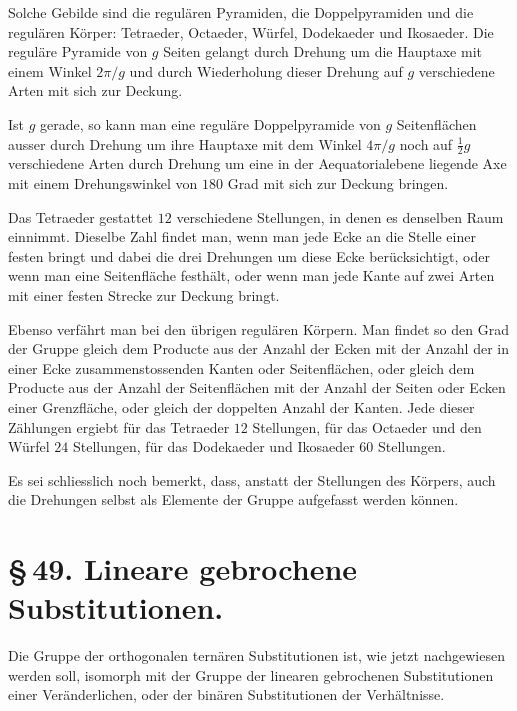 \documentclass[11pt]{article}
\begin{document}
Solche Gebilde sind die regulären Pyramiden, die Doppelpyramiden und die regulären Körper: Tetraeder, Octaeder, Würfel, Dodekaeder und Ikosaeder. Die reguläre Pyramide von $g$ Seiten gelangt durch Drehung um die Hauptaxe mit einem Winkel $2\pi/g$ und durch Wiederholung dieser Drehung auf $g$ verschiedene Arten mit sich zur Deckung.

Ist $g$ gerade, so kann man eine reguläre Doppelpyramide von $g$ Seitenflächen ausser durch Drehung um ihre Hauptaxe mit dem Winkel $4\pi/g$ noch auf $\frac12g$ verschiedene Arten durch Drehung um eine in der Aequatorialebene liegende Axe mit einem Drehungswinkel von $180$ Grad mit sich zur Deckung bringen.

Das Tetraeder gestattet $12$ verschiedene Stellungen, in denen es denselben Raum einnimmt. Dieselbe Zahl findet man, wenn man jede Ecke an die Stelle einer festen bringt und dabei die drei Drehungen um diese Ecke berücksichtigt, oder wenn man eine Seitenfläche festhält, oder wenn man jede Kante auf zwei Arten mit einer festen Strecke zur Deckung bringt.

Ebenso verfährt man bei den übrigen regulären Körpern. Man findet so den Grad der Gruppe gleich dem Producte aus der Anzahl der Ecken mit der Anzahl der in einer Ecke zusammenstossenden Kanten oder Seitenflächen, oder gleich dem Producte aus der Anzahl der Seitenflächen mit der Anzahl der Seiten oder Ecken einer Grenzfläche, oder gleich der doppelten Anzahl der Kanten. Jede dieser Zählungen ergiebt für das Tetraeder $12$ Stellungen, für das Octaeder und den Würfel $24$ Stellungen, für das Dodekaeder und Ikosaeder $60$ Stellungen.

Es sei schliesslich noch bemerkt, dass, anstatt der Stellungen des Körpers, auch die Drehungen selbst als Elemente der Gruppe aufgefasst werden können.

\section*{\S\,49. Lineare gebrochene Substitutionen.}

Die Gruppe der orthogonalen ternären Substitutionen ist, wie jetzt nachgewiesen werden soll, isomorph mit der Gruppe der linearen gebrochenen Substitutionen einer Veränderlichen, oder der binären Substitutionen der Verhältnisse.
\end{document}
